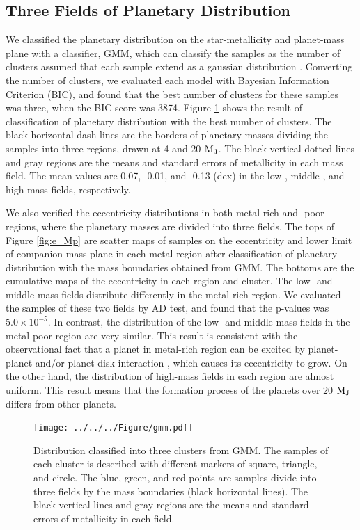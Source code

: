 \documentclass[twocolumn, dvipdfmx]{aastex62}
\begin{document}
\begin{CJK*}{UTF8}{min}
\subsection{Three Fields of Planetary Distribution}

We classified the planetary distribution on the star-metallicity and planet-mass plane with a classifier, GMM, which can classify the samples as the number of clusters assumed that each sample extend as a gaussian distribution \citep[e.g.,][]{2017A&A...603A..30S, 2018ApJ...853...37S}. Converting the number of clusters, we evaluated each model with Bayesian Information Criterion (BIC), and found that the best number of clusters for these samples was three, when the BIC score was 3874. Figure \ref{fig:gmm} shows the result of classification of planetary distribution with the best number of clusters. The black horizontal dash lines are the borders of planetary masses dividing the samples into three regions, drawn at 4 and 20 $\rm M_J$. The black vertical dotted lines and gray regions are the means and standard errors of metallicity in each mass field. The mean values are 0.07, -0.01, and -0.13 (dex) in the low-, middle-, and high-mass fields, respectively.

We also verified the eccentricity distributions in both metal-rich and -poor regions, where the planetary masses are divided into three fields. The tops of Figure \ref{fig:e_Mp} are scatter maps of samples on the eccentricity and lower limit of companion mass plane in each metal region after classification of planetary distribution with the mass boundaries obtained from GMM. The bottoms are the cumulative maps of the eccentricity in each region and cluster. The low- and middle-mass fields distribute differently in the metal-rich region. We evaluated the samples of these two fields by AD test, and found that the p-values was $5.0\times10^{-5}$. In contrast, the distribution of the low- and middle-mass fields in the metal-poor region are very similar. This result is consistent with the observational fact that a planet in metal-rich region can be excited by planet-planet and/or planet-disk interaction \citep[e.g.,][]{2013A&A...560A..51A, 2013ApJ...767L..24D}, which causes its eccentricity to grow. On the other hand, the distribution of high-mass fields in each region are almost uniform. This result means that the formation process of the planets over 20 $\rm M_J$ differs from other planets.

\begin{figure}[t]
\begin{center}
\texttt{[image: ../../../Figure/gmm.pdf]}
\caption{Distribution classified into three clusters from GMM. The samples of each cluster is described with different markers of square, triangle, and circle. The blue, green, and red points are samples divide into three fields by the mass boundaries (black horizontal lines). The black vertical lines and gray regions are the means and standard errors of metallicity in each field. \label{fig:gmm}}
\end{center}
\end{figure}


\end{CJK*}
\end{document}
